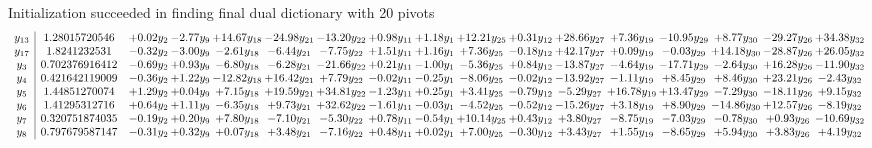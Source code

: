 \documentclass[9pt]{article}
\begin{document}
Initialization succeeded in finding final dual dictionary with 20 pivots
\[\begin{array}{c| c c@{\hskip 2pt} c@{\hskip 2pt} c@{\hskip 2pt} c@{\hskip 2pt} c@{\hskip 2pt} c@{\hskip 2pt} c@{\hskip 2pt} c@{\hskip 2pt} c@{\hskip 2pt} c@{\hskip 2pt} c@{\hskip 2pt} c@{\hskip 2pt} c@{\hskip 2pt} c@{\hskip 2pt} c@{\hskip 2pt} }
 y_{13}   &  1.28015720546 & +  0.02 y_{2} & -2.77 y_{9} & + 14.67 y_{18} & -24.98 y_{21} & -13.20 y_{22} & +  0.98 y_{11} & +  1.18 y_{1} & + 12.21 y_{25} & +  0.31 y_{12} & + 28.66 y_{27} & +  7.36 y_{19} & -10.95 y_{29} & +  8.77 y_{30} & -29.27 y_{26} & + 34.38 y_{32}\\
 y_{17}   &  1.8241232531 & -0.32 y_{2} & -3.00 y_{9} & -2.61 y_{18} & -6.44 y_{21} & -7.75 y_{22} & +  1.51 y_{11} & +  1.16 y_{1} & +  7.36 y_{25} & -0.18 y_{12} & + 42.17 y_{27} & +  0.09 y_{19} & -0.03 y_{29} & + 14.18 y_{30} & -28.87 y_{26} & + 26.05 y_{32}\\
 y_{3}   &  0.702376916412 & -0.69 y_{2} & +  0.93 y_{9} & -6.80 y_{18} & -6.28 y_{21} & -21.66 y_{22} & +  0.21 y_{11} & -1.00 y_{1} & -5.36 y_{25} & +  0.84 y_{12} & -13.87 y_{27} & -4.64 y_{19} & -17.71 y_{29} & -2.64 y_{30} & + 16.28 y_{26} & -11.90 y_{32}\\
 y_{4}   &  0.421642119009 & -0.36 y_{2} & +  1.22 y_{9} & -12.82 y_{18} & + 16.42 y_{21} & +  7.79 y_{22} & -0.02 y_{11} & -0.25 y_{1} & -8.06 y_{25} & -0.02 y_{12} & -13.92 y_{27} & -1.11 y_{19} & +  8.45 y_{29} & +  8.46 y_{30} & + 23.21 y_{26} & -2.43 y_{32}\\
 y_{5}   &  1.44851270074 & +  1.29 y_{2} & +  0.04 y_{9} & +  7.15 y_{18} & + 19.59 y_{21} & + 34.81 y_{22} & -1.23 y_{11} & +  0.25 y_{1} & +  3.41 y_{25} & -0.79 y_{12} & -5.29 y_{27} & + 16.78 y_{19} & + 13.47 y_{29} & -7.29 y_{30} & -18.11 y_{26} & +  9.15 y_{32}\\
 y_{6}   &  1.41295312716 & +  0.64 y_{2} & +  1.11 y_{9} & -6.35 y_{18} & +  9.73 y_{21} & + 32.62 y_{22} & -1.61 y_{11} & -0.03 y_{1} & -4.52 y_{25} & -0.52 y_{12} & -15.26 y_{27} & +  3.18 y_{19} & +  8.90 y_{29} & -14.86 y_{30} & + 12.57 y_{26} & -8.19 y_{32}\\
 y_{7}   &  0.320751874035 & -0.19 y_{2} & +  0.20 y_{9} & +  7.80 y_{18} & -7.10 y_{21} & -5.30 y_{22} & +  0.78 y_{11} & -0.54 y_{1} & + 10.14 y_{25} & +  0.43 y_{12} & +  3.80 y_{27} & -8.75 y_{19} & -7.03 y_{29} & -0.78 y_{30} & +  0.93 y_{26} & -10.69 y_{32}\\
 y_{8}   &  0.797679587147 & -0.31 y_{2} & +  0.32 y_{9} & +  0.07 y_{18} & +  3.48 y_{21} & -7.16 y_{22} & +  0.48 y_{11} & +  0.02 y_{1} & +  7.00 y_{25} & -0.30 y_{12} & +  3.43 y_{27} & +  1.55 y_{19} & -8.65 y_{29} & +  5.94 y_{30} & +  3.83 y_{26} & +  4.19 y_{32}\\

\end{array}\]
\end{document}
